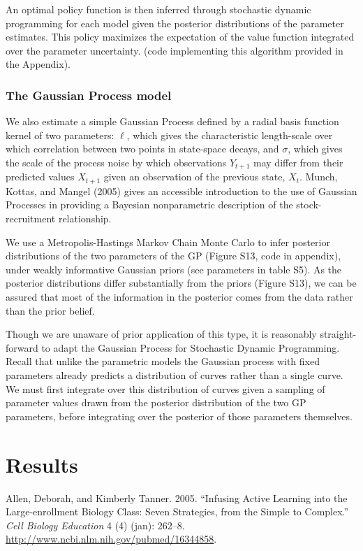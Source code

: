 \documentclass[author-year, review]{elsarticle} %
\begin{document}
An optimal policy function is then inferred through stochastic dynamic
programming for each model given the posterior distributions of the
parameter estimates. This policy maximizes the expectation of the value
function integrated over the parameter uncertainty. (code implementing
this algorithm provided in the Appendix).

\subsubsection{The Gaussian Process
model}\label{the-gaussian-process-model}

We also estimate a simple Gaussian Process defined by a radial basis
function kernel of two parameters: $\ell$, which gives the
characteristic length-scale over which correlation between two points in
state-space decays, and $\sigma$, which gives the scale of the process
noise by which observations $Y_{t+1}$ may differ from their predicted
values $X_{t+1}$ given an observation of the previous state, $X_t$.
Munch, Kottas, and Mangel (2005) gives an accessible introduction to the
use of Gaussian Processes in providing a Bayesian nonparametric
description of the stock-recruitment relationship.

We use a Metropolis-Hastings Markov Chain Monte Carlo to infer posterior
distributions of the two parameters of the GP (Figure S13, code in
appendix), under weakly informative Gaussian priors (see parameters in
table S5). As the posterior distributions differ substantially from the
priors (Figure S13), we can be assured that most of the information in
the posterior comes from the data rather than the prior belief.

Though we are unaware of prior application of this type, it is
reasonably straight-forward to adapt the Gaussian Process for Stochastic
Dynamic Programming. Recall that unlike the parametric models the
Gaussian process with fixed parameters already predicts a distribution
of curves rather than a single curve. We must first integrate over this
distribution of curves given a sampling of parameter values drawn from
the posterior distribution of the two GP parameters, before integrating
over the posterior of those parameters themselves.

\section{Results}\label{results}

Allen, Deborah, and Kimberly Tanner. 2005. ``Infusing Active Learning
into the Large-enrollment Biology Class: Seven Strategies, from the
Simple to Complex.'' \emph{Cell Biology Education} 4 (4) (jan): 262--8.
\url{http://www.ncbi.nlm.nih.gov/pubmed/16344858}.
\end{document}
